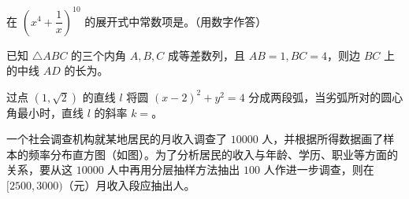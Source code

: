 \begin{question}
在 $\left(x^4+\dfrac1x\right)^{10}$ 的展开式中常数项是\gkblank{}。（用数字作答）

\end{question}
\begin{question}
已知 $\triangle ABC$ 的三个内角 $A,B,C$ 成等差数列，且 $AB=1,BC=4$，则边 $BC$ 上的中线 $AD$ 的长为\gkblank{}。

\end{question}
\begin{question}
过点 $(1,\sqrt2)$ 的直线 $l$ 将圆 $(x-2)^2+y^2=4$ 分成两段弧，当劣弧所对的圆心角最小时，直线 $l$ 的斜率 $k=$\gkblank{}。

\Needspace{0.4\textheight}
\end{question}
\begin{question}
一个社会调查机构就某地居民的月收入调查了 $10000$ 人，并根据所得数据画了样本的频率分布直方图（如图）。为了分析居民的收入与年龄、学历、职业等方面的关系，要从这 $10000$ 人中再用分层抽样方法抽出 $100$ 人作进一步调查，则在 $[2500,3000)$（元）月收入段应抽出\gkblank{}人。
\nopagebreak[4]
\begin{center}\end{center}
\nopagebreak[4]
\end{question}

